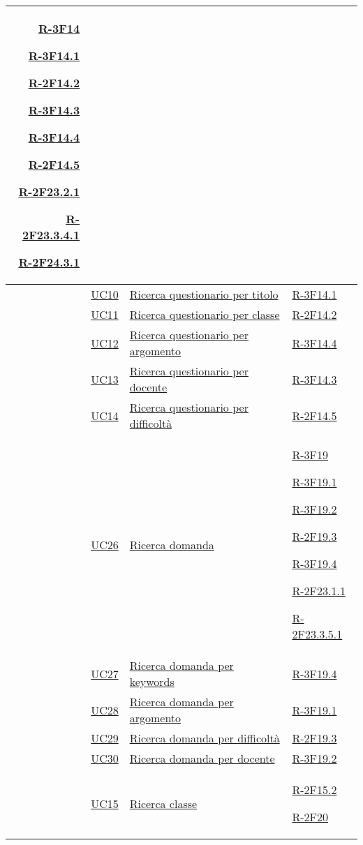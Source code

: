\begin{longtable}{|r l p{5cm}|p{3cm}|}
	\hyperlink{R-3F14}{R-3F14}
	
	\hyperlink{R-3F14.1}{R-3F14.1}
	
	\hyperlink{R-2F14.2}{R-2F14.2}
	
	\hyperlink{R-3F14.3}{R-3F14.3}
	
	\hyperlink{R-3F14.4}{R-3F14.4}
	
	\hyperlink{R-2F14.5}{R-2F14.5}
	
	\hyperlink{R-2F23.2.1}{R-2F23.2.1}
	
	\hyperlink{R-2F23.3.4.1}{R-2F23.3.4.1}
	
	\hyperlink{R-2F24.3.1}{R-2F24.3.1}\tabularnewline
	\hline
	& \hyperlink{UC10}{UC10} & \hyperlink{UC10}{Ricerca questionario per titolo} & \hyperlink{R-3F14.1}{R-3F14.1}\tabularnewline
	\hline
	& \hyperlink{UC11}{UC11} & \hyperlink{UC11}{Ricerca questionario per classe} & \hyperlink{R-2F14.2}{R-2F14.2}\tabularnewline
	\hline
	& \hyperlink{UC12}{UC12} & \hyperlink{UC12}{Ricerca questionario per argomento} & \hyperlink{R-3F14.4}{R-3F14.4}\tabularnewline
	\hline
	& \hyperlink{UC13}{UC13} & \hyperlink{UC13}{Ricerca questionario per docente} & \hyperlink{R-3F14.3}{R-3F14.3}\tabularnewline
	\hline
	& \hyperlink{UC14}{UC14} & \hyperlink{UC14}{Ricerca questionario per difficoltà} & \hyperlink{R-2F14.5}{R-2F14.5}\tabularnewline
	\hline
	& \hyperlink{UC26}{UC26} & \hyperlink{UC26}{Ricerca domanda} & \hyperlink{R-3F19}{R-3F19}
	
	\hyperlink{R-3F19.1}{R-3F19.1}
	
	\hyperlink{R-3F19.2}{R-3F19.2}
	
	\hyperlink{R-2F19.3}{R-2F19.3}
	
	\hyperlink{R-3F19.4}{R-3F19.4}
	
	\hyperlink{R-2F23.1.1}{R-2F23.1.1}
	
	\hyperlink{R-2F23.3.5.1}{R-2F23.3.5.1}\tabularnewline
	\hline
	& \hyperlink{UC27}{UC27} & \hyperlink{UC27}{Ricerca domanda per keywords} & \hyperlink{R-3F19.4}{R-3F19.4}\tabularnewline
	\hline
	& \hyperlink{UC28}{UC28} & \hyperlink{UC28}{Ricerca domanda per argomento} & \hyperlink{R-3F19.1}{R-3F19.1}\tabularnewline
	\hline
	& \hyperlink{UC29}{UC29} & \hyperlink{UC29}{Ricerca domanda per difficoltà} & \hyperlink{R-2F19.3}{R-2F19.3}\tabularnewline
	\hline
	& \hyperlink{UC30}{UC30} & \hyperlink{UC30}{Ricerca domanda per docente} & \hyperlink{R-3F19.2}{R-3F19.2}\tabularnewline
	\hline
	& \hyperlink{UC15}{UC15} & \hyperlink{UC15}{Ricerca classe} & \hyperlink{R-2F15.2}{R-2F15.2}
	
	\hyperlink{R-2F20}{R-2F20}
	

\end{longtable}
